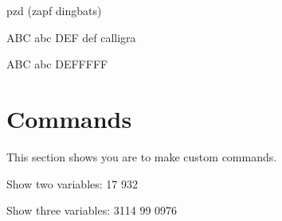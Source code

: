 {\fontsize{12pt}{1em}\selectfont pzd (zapf dingbats)           }\par

{\fontsize{20pt}{1em}\selectfont ABC abc DEF def calligra}\par

{\fontsize{20pt}{1em}\selectfont{}}\par



ABC abc DEFFFFF\par

\fontencoding{\encodingdefault}
\fontfamily{\familydefault}
\fontseries{\seriesdefault}
\fontshape{\shapedefault}
\selectfont

\section{Commands}
This section shows you are to make custom commands.

\newcommand{\testcmd}[2]{Show two variables: {#1} {#2}}
\testcmd{17}{932}

\newcommand{\anothertestcmd}[3]{Show three variables: {#1} {#2} {#3}}
\anothertestcmd{3114}{99}{0976}






